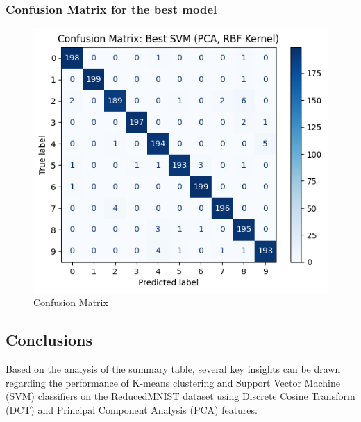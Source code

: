 \documentclass[12pt]{article}
\begin{document}
\subsubsection{Confusion Matrix for the best model}
\begin{figure}[h]
    \centering
    \includegraphics[width=1\linewidth]{CF.png}
    \caption{Confusion Matrix}
    \label{fig:enter-label}
\end{figure}

\subsection{Conclusions}
Based on the analysis of the summary table, several key insights can be drawn regarding the performance of K-means clustering and Support Vector Machine (SVM) classifiers on the ReducedMNIST dataset using Discrete Cosine Transform (DCT) and Principal Component Analysis (PCA) features.
\end{document}
